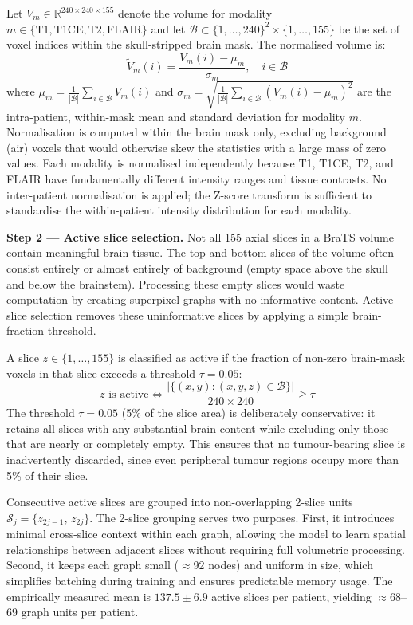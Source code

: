 \documentclass{article}
\begin{document}
Let $V_m \in \mathbb{R}^{240 \times 240 \times 155}$ denote the volume for modality
$m \in \{\text{T1}, \text{T1CE}, \text{T2}, \text{FLAIR}\}$ and let
$\mathcal{B} \subset \{1,\dots,240\}^2 \times \{1,\dots,155\}$ be the set of voxel
indices within the skull-stripped brain mask. The normalised volume is:
\[
    \tilde{V}_m(i) = \frac{V_m(i) - \mu_m}{\sigma_m},
    \quad i \in \mathcal{B}
\]
where $\mu_m = \frac{1}{|\mathcal{B}|}\sum_{i \in \mathcal{B}} V_m(i)$ and
$\sigma_m = \sqrt{\frac{1}{|\mathcal{B}|}\sum_{i \in \mathcal{B}}(V_m(i)-\mu_m)^2}$
are the intra-patient, within-mask mean and standard deviation for modality $m$.
Normalisation is computed within the brain mask only, excluding background
(air) voxels that would otherwise skew the statistics with a large mass of zero
values. Each modality is normalised independently because T1, T1CE, T2, and FLAIR
have fundamentally different intensity ranges and tissue contrasts. No
inter-patient normalisation is applied; the Z-score transform is sufficient to
standardise the within-patient intensity distribution for each modality.

\textbf{Step 2 --- Active slice selection.}
Not all 155 axial slices in a BraTS volume contain meaningful brain tissue.
The top and bottom slices of the volume often consist entirely or almost
entirely of background (empty space above the skull and below the brainstem).
Processing these empty slices would waste computation by creating superpixel
graphs with no informative content. Active slice selection removes these
uninformative slices by applying a simple brain-fraction threshold.

A slice $z \in \{1,\dots,155\}$ is classified as active if the fraction of
non-zero brain-mask voxels in that slice exceeds a threshold $\tau = 0.05$:
\[
    z \text{ is active} \iff
    \frac{|\{(x,y) : (x,y,z) \in \mathcal{B}\}|}{240 \times 240} \geq \tau
\]
The threshold $\tau = 0.05$ (5\% of the slice area) is deliberately
conservative: it retains all slices with any substantial brain content while
excluding only those that are nearly or completely empty. This ensures that no
tumour-bearing slice is inadvertently discarded, since even peripheral tumour
regions occupy more than 5\% of their slice.

Consecutive active slices are grouped into non-overlapping 2-slice units
$\mathcal{S}_j = \{z_{2j-1},\, z_{2j}\}$. The 2-slice grouping serves two
purposes. First, it introduces minimal cross-slice context within each graph,
allowing the model to learn spatial relationships between adjacent slices
without requiring full volumetric processing. Second, it keeps each graph
small ($\approx$92 nodes) and uniform in size, which simplifies batching
during training and ensures predictable memory usage. The empirically measured
mean is $137.5 \pm 6.9$ active slices per patient, yielding $\approx$68--69
graph units per patient.
\end{document}
